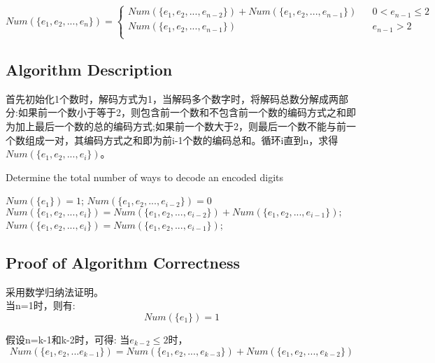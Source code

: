 \documentclass{article}
\begin{document}
\begin{equation} 
Num(\{e_1,e_2,...,e_n\})=\left\{
\begin{array}{lcr}
Num(\{e_1,e_2,...,e_{n-2}\}) + Num(\{e_1,e_2,...,e_{n-1}\})      &      & 0< e_{n-1} \leq 2\\
Num(\{e_1,e_2,...,e_{n-1}\})     &      & e_{n-1} > 2\\

\end{array} \right.
\end{equation} 

\subsection{Algorithm Description}
首先初始化1个数时，解码方式为1，当解码多个数字时，将解码总数分解成两部分:如果前一个数小于等于2，则包含前一个数和不包含前一个数的编码方式之和即为加上最后一个数的总的编码方式;如果前一个数大于2，则最后一个数不能与前一个数组成一对，其编码方式之和即为前i-1个数的编码总和。循环i直到n，求得$Num(\{e_1,e_2,...,e_i\})$。

\begin{algorithm}[htbp]  
  \caption{Determine the total number of ways to decode an encoded digits}  
  \begin{algorithmic}[1] 
	\State $Num(\{e_1\})=1$;
	\State $Num(\{e_1,e_2,...,e_{i-2}\})=0$
	\EndIf
	\State $Num(\{e_1,e_2,...,e_i\})=Num(\{e_1,e_2,...,e_{i-2}\}) + Num(\{e_1,e_2,...,e_{i-1}\});$
	\Else 
	\State $Num(\{e_1,e_2,...,e_i\}) = Num(\{e_1,e_2,...,e_{i-1}\})$;
	\EndIf
     \EndFor
    \EndFunction  
  \end{algorithmic}  
\end{algorithm} 


\subsection{Proof of Algorithm Correctness}
采用数学归纳法证明。
\\

当n=1时，则有:
\begin{equation} 
Num(\{e_1\})=1
\end{equation} 

假设n=k-1和k-2时，可得:
当$e_{k-2} \leq 2$时，
\begin{equation}
Num(\{e_1,e_2,...e_{k-1}\})=Num(\{e_1,e_2,...,e_{k-3}\}) + Num(\{e_1,e_2,...,e_{k-2}\})
\end{equation}
\end{document}
